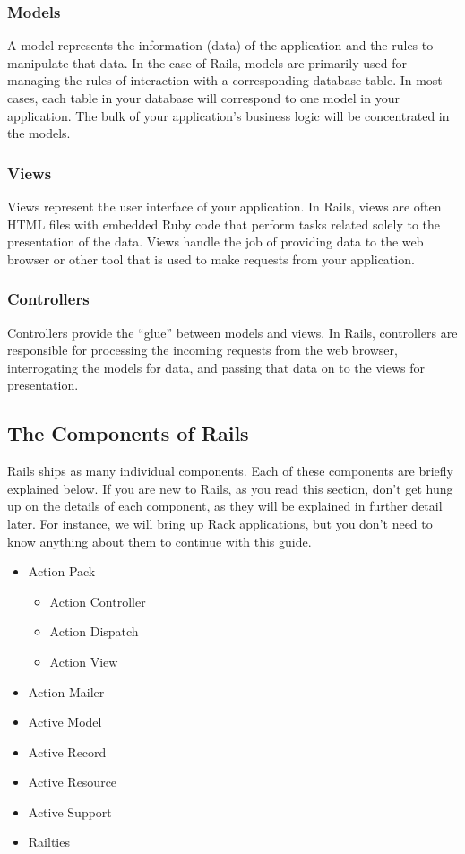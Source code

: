 \documentclass[10pt]{book}
\begin{document}
\subsubsection{ Models}

A model represents the information (data) of the application and the rules to manipulate that data. In the case of Rails, models are primarily used for managing the rules of interaction with a corresponding database table. In most cases, each table in your database will correspond to one model in your application. The bulk of your application’s business logic will be concentrated in the models.

\subsubsection{ Views}

Views represent the user interface of your application. In Rails, views are often HTML files with embedded Ruby code that perform tasks related solely to the presentation of the data. Views handle the job of providing data to the web browser or other tool that is used to make requests from your application.

\subsubsection{ Controllers}

Controllers provide the “glue” between models and views. In Rails, controllers are responsible for processing the incoming requests from the web browser, interrogating the models for data, and passing that data on to the views for presentation.

\subsection{ The Components of Rails}

Rails ships as many individual components.  Each of these components are briefly explained below.  If you are new to Rails, as you read this section, don’t get hung up on the details of each component, as they will be explained in further detail later.  For instance, we will bring up Rack applications, but you don’t need to know anything about them to continue with this guide.
\begin{itemize}
	\item Action Pack  
\begin{itemize}
	\item Action Controller
	\item Action Dispatch
	\item Action View
\end{itemize}
	\item Action Mailer
	\item Active Model
	\item Active Record
	\item Active Resource
	\item Active Support
	\item Railties
\end{itemize}
\end{document}
